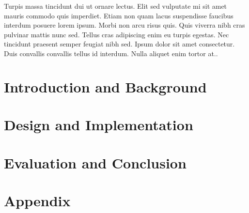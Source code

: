 \documentclass[UKenglish]{ifimaster}  %
\begin{document}
    Turpis massa tincidunt dui ut ornare lectus. Elit sed vulputate mi sit amet mauris commodo quis imperdiet. Etiam non quam lacus suspendisse faucibus interdum posuere lorem ipsum. Morbi non arcu risus quis. Quis viverra nibh cras pulvinar mattis nunc sed. Tellus cras adipiscing enim eu turpis egestas. Nec tincidunt praesent semper feugiat nibh sed. Ipsum dolor sit amet consectetur. Duis convallis convallis tellus id interdum. Nulla aliquet enim tortor at..

\tableofcontents

\lstlistoflistings

\listoftables

\listoffigures

\mainmatter{}

\part{Introduction and Background}




\part{Design and Implementation}



\part{Evaluation and Conclusion}





\part*{Appendix}

\appendix{}


\backmatter{}
\printbibliography
\end{document}
